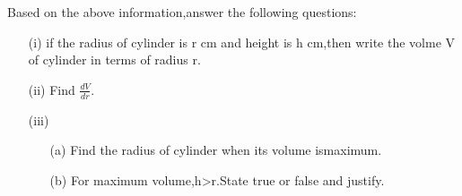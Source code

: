 \documentclass{article}
\begin{document}
\begin{enumerate}
		Based on the above information,answer the following questions:\\
		
			\begin{enumerate}
				\item[(i)] if the radius of cylinder is r cm and height is h cm,then write the volme V of cylinder in terms of radius r.
					\\
				\item[(ii)] Find $ \frac {dV}{dr} $.
					\\
				\item[(iii)] \begin{enumerate}
						\item[(a)] Find the radius of cylinder when its volume ismaximum.\\
			
		\item[(b)] For maximum volume,h>r.State true or false and justify.
				
			
				\end{enumerate}
			\end{enumerate}
\end{enumerate}
\end{document}
